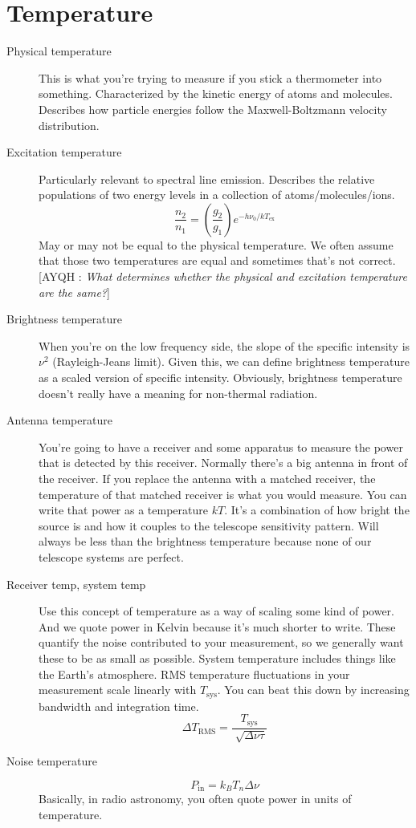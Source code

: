 \documentclass[a4paper]{article}
\newcommand{\Comment}[2]{ [{\color{red}\sc #1 :} {{\color{cyan} \it #2}}]}
\begin{document}
\section{Temperature}

\begin{description}

\item[Physical temperature]
This is what you're trying to measure if you stick a thermometer into something. Characterized by the kinetic energy of atoms and molecules. Describes how particle energies follow the Maxwell-Boltzmann velocity distribution. 

\item[Excitation temperature]
Particularly relevant to spectral line emission. Describes the relative populations of two energy levels in a collection of atoms/molecules/ions. 
$$ \frac{n_2}{n_1} = \left( \frac{g_2}{g_1} \right) e^{-h\nu_0 / kT_\mathrm{ex}} $$
May or may not be equal to the physical temperature. We often assume that those two temperatures are equal and sometimes that's not correct. \Comment{AYQH}{What determines whether the physical and excitation temperature are the same?}

\item[Brightness temperature] When you're on the low frequency side, the slope of the specific intensity is $\nu^2$ (Rayleigh-Jeans limit). Given this, we can define brightness temperature as a scaled version of specific intensity. Obviously, brightness temperature doesn't really have a meaning for non-thermal radiation.

\item[Antenna temperature] You're going to have a receiver and some apparatus to measure the power that is detected by this receiver. Normally there's a big antenna in front of the receiver. If you replace the antenna with a matched receiver, the temperature of that matched receiver is what you would measure. You can write that power as a temperature $kT$. It's a combination of how bright the source is and how it couples to the telescope sensitivity pattern. Will always be less than the brightness temperature because none of our telescope systems are perfect. 

\item[Receiver temp, system temp] Use this concept of temperature as a way of scaling some kind of power. And we quote power in Kelvin because it's much shorter to write. These quantify the noise contributed to your measurement, so we generally want these to be as small as possible. System temperature includes things like the Earth's atmosphere. RMS temperature fluctuations in your measurement scale linearly with $T_\mathrm{sys}$. You can beat this down by increasing bandwidth and integration time. 
$$ \Delta T_\mathrm{RMS} = \frac{T_\mathrm{sys}}{\sqrt[]{\Delta \nu \tau}} $$

\item[Noise temperature] $$ P_\mathrm{in} = k_B T_n \Delta \nu $$ Basically, in radio astronomy, you often quote power in units of temperature. 

\end{description}
\end{document}
